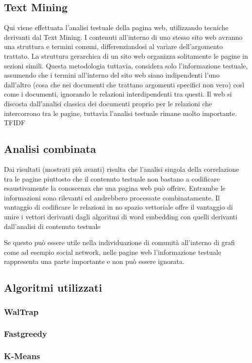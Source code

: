 \subsection{Text Mining}
Qui viene effettuata l'analisi testuale della pagina web, utilizzando tecniche derivanti dal Text Mining. I contenuti all'interno di uno stesso sito web avranno una struttura e termini comuni, differenziandosi al variare dell'argomento trattato. La struttura gerarchica di un sito web organizza solitamente le pagine in sezioni simili. Questa metodologia tuttavia, considera solo l'informazione testuale, assumendo che i termini all'interno del sito web siano indipendenti l'uno dall'altro (cosa che nei documenti che trattano argomenti specifici non  vero) così come i documenti, ignorando le relazioni interdipendenti tra questi. Il web si discosta dall'analisi classica dei documenti proprio per le relazioni che intercorrono tra le pagine, tuttavia l'analisi testuale rimane molto importante. TFIDF

\subsection{Analisi combinata}
Dai risultati (mostrati più avanti) risulta che l'analisi singola della correlazione tra le pagine piuttosto che il contenuto testuale non bastano a codificare esaustivamente la conoscenza che una pagina web può offrire. Entrambe le informazioni sono rilevanti ed andrebbero processate combinatamente. Il vantaggio di codificare le relazioni in no spazio vettoriale offre il vantaggio di unire i vettori derivanti dagli algoritmi di word embedding con quelli derivanti dall'analisi di contenuto testuale

Se questo può essere utile nella individuazione di comunità all'interno di grafi come ad esempio social network, nelle pagine web l'informazione testuale rappresenta una parte importante e non può essere ignorata.

\subsection{Algoritmi utilizzati}
\subsubsection{WalTrap}
\subsubsection{Fastgreedy}
\subsubsection{K-Means}
